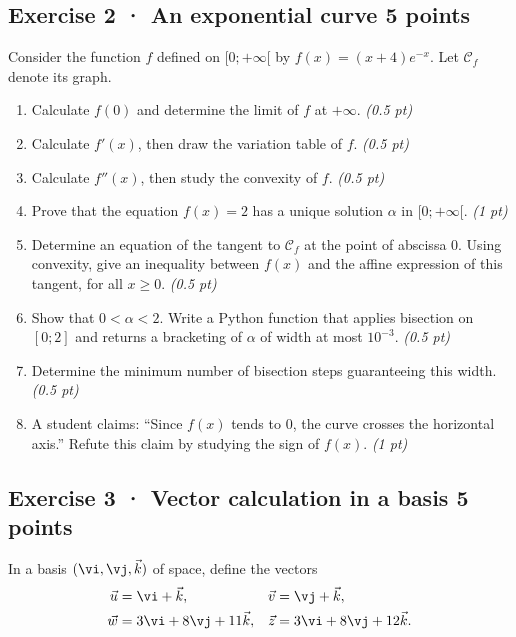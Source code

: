 \subsection*{Exercise 2 · An exponential curve \hfill 5 points}Consider the function $f$ defined on $[0;+\infty[$ by $f(x)=(x+4)e^{-x}$. Let $\mathcal C_f$ denote its graph.

\begin{enumerate}

\item Calculate $f(0)$ and determine the limit of $f$ at $+\infty$. \hfill\textit{(0.5 pt)}

\item Calculate $f'(x)$, then draw the variation table of $f$. \hfill\textit{(0.5 pt)}

\item Calculate $f''(x)$, then study the convexity of $f$. \hfill\textit{(0.5 pt)}

\item Prove that the equation $f(x)=2$ has a unique solution $\alpha$ in $[0;+\infty[$. \hfill\textit{(1 pt)}

\item Determine an equation of the tangent to $\mathcal C_f$ at the point of abscissa $0$. Using convexity, give an inequality between $f(x)$ and the affine expression of this tangent, for all $x\ge0$. \hfill\textit{(0.5 pt)}

\item Show that $0<\alpha<2$. Write a Python function that applies bisection on $[0;2]$ and returns a bracketing of $\alpha$ of width at most $10^{-3}$. \hfill\textit{(0.5 pt)}

\item Determine the minimum number of bisection steps guaranteeing this width. \hfill\textit{(0.5 pt)}

\clearpage\item A student claims: ``Since $f(x)$ tends to $0$, the curve crosses the horizontal axis.'' Refute this claim by studying the sign of $f(x)$. \hfill\textit{(1 pt)}

\end{enumerate}

\clearpage{}\par

\subsection*{Exercise 3 · Vector calculation in a basis \hfill 5 points}In a basis $(\vi,\vj,\vec k)$ of space, define the vectors
\[\begin{aligned}\vec u&=\vi+\vec k,&\vec v&=\vj+\vec k,\\
\vec w&=3\vi+8\vj+11\vec k,&\vec z&=3\vi+8\vj+12\vec k.\end{aligned}\]

